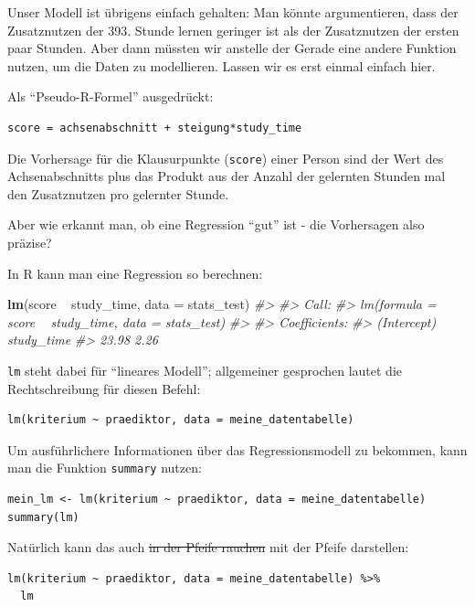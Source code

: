 \documentclass[12pt,ngerman,]{book}
\makeatletter
\newenvironment{Shaded}{\begin{snugshade}}{\end{snugshade}}
\newcommand{\KeywordTok}[1]{\textcolor[rgb]{0.13,0.29,0.53}{\textbf{{#1}}}}
\newcommand{\DataTypeTok}[1]{\textcolor[rgb]{0.13,0.29,0.53}{{#1}}}
\newcommand{\StringTok}[1]{\textcolor[rgb]{0.31,0.60,0.02}{{#1}}}
\newcommand{\CommentTok}[1]{\textcolor[rgb]{0.56,0.35,0.01}{\textit{{#1}}}}
\newcommand{\NormalTok}[1]{{#1}}
\newenvironment{kframe}{%
\medskip{}
\setlength{\fboxsep}{.8em}
 \def\at@end@of@kframe{}%
 \ifinner\ifhmode%
  \def\at@end@of@kframe{\end{minipage}}%
  \begin{minipage}{\columnwidth}%
 \fi\fi%
 \def\FrameCommand##1{\hskip\@totalleftmargin \hskip-\fboxsep
 \colorbox{shadecolor}{##1}\hskip-\fboxsep
     \hskip-\linewidth \hskip-\@totalleftmargin \hskip\columnwidth}%
 \MakeFramed {\advance\hsize-\width
   \@totalleftmargin\z@ \linewidth\hsize
   \@setminipage}}%
 {\par\unskip\endMakeFramed%
 \at@end@of@kframe}
\renewenvironment{Shaded}{\begin{kframe}}{\end{kframe}}
\makeatother
\begin{document}
Unser Modell ist übrigens einfach gehalten: Man könnte argumentieren,
dass der Zusatznutzen der 393. Stunde lernen geringer ist als der
Zusatznutzen der ersten paar Stunden. Aber dann müssten wir anstelle der
Gerade eine andere Funktion nutzen, um die Daten zu modellieren. Lassen
wir es erst einmal einfach hier.

Als ``Pseudo-R-Formel'' ausgedrückt:

\begin{verbatim}
score = achsenabschnitt + steigung*study_time
\end{verbatim}

Die Vorhersage für die Klausurpunkte (\texttt{score}) einer Person sind
der Wert des Achsenabschnitts plus das Produkt aus der Anzahl der
gelernten Stunden mal den Zusatznutzen pro gelernter Stunde.

Aber wie erkannt man, ob eine Regression ``gut'' ist - die Vorhersagen
also präzise?

In R kann man eine Regression so berechnen:

\begin{Shaded}
\begin{Highlighting}[]
\KeywordTok{lm}\NormalTok{(score ~}\StringTok{ }\NormalTok{study_time, }\DataTypeTok{data =} \NormalTok{stats_test)}
\CommentTok{#> }
\CommentTok{#> Call:}
\CommentTok{#> lm(formula = score ~ study_time, data = stats_test)}
\CommentTok{#> }
\CommentTok{#> Coefficients:}
\CommentTok{#> (Intercept)   study_time  }
\CommentTok{#>       23.98         2.26}
\end{Highlighting}
\end{Shaded}

\texttt{lm} steht dabei für ``lineares Modell''; allgemeiner gesprochen
lautet die Rechtschreibung für diesen Befehl:

\begin{verbatim}
lm(kriterium ~ praediktor, data = meine_datentabelle)
\end{verbatim}

Um ausführlichere Informationen über das Regressionsmodell zu bekommen,
kann man die Funktion \texttt{summary} nutzen:

\begin{verbatim}
mein_lm <- lm(kriterium ~ praediktor, data = meine_datentabelle)
summary(lm)
\end{verbatim}

Natürlich kann das auch \sout{in der Pfeife rauchen} mit der Pfeife
darstellen:

\begin{verbatim}
lm(kriterium ~ praediktor, data = meine_datentabelle) %>% 
  lm
\end{verbatim}
\end{document}
